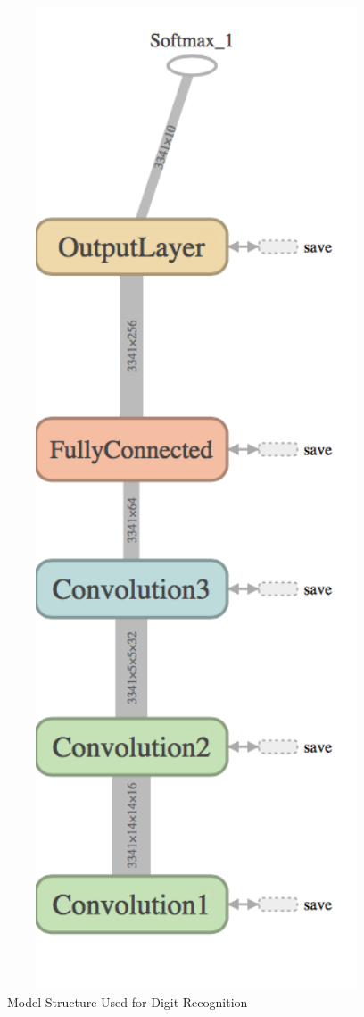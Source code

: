 \documentclass[final,12p,times]{elsarticle}
\begin{document}
\begin{Itemize}
\begin{figure}[H]
  \includegraphics[width=1.0\textwidth, center]{network.png}
  \caption{Model Structure Used for Digit Recognition}
  \label{fig:Fig4.3}
  \end{figure}
  



\end{Itemize}
\end{document}
